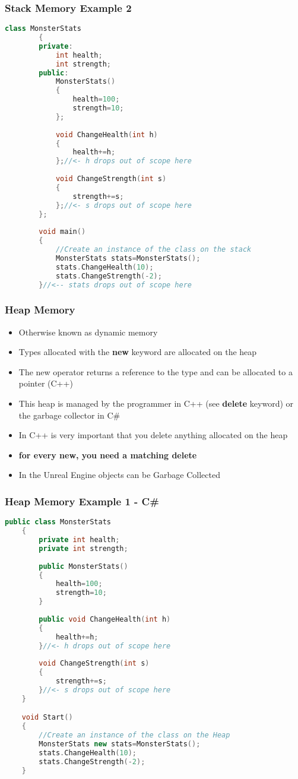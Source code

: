 \begin{frame}[fragile]
\frametitle{Stack Memory Example 2}
	\begin{lstlisting}[language=C++,basicstyle=\tiny,]
		class MonsterStats
		{
		private:
			int health;
			int strength;
		public:
			MonsterStats()
			{
				health=100;
				strength=10;
			};
	
			void ChangeHealth(int h)
			{
				health+=h;
			};//<- h drops out of scope here
	
			void ChangeStrength(int s)
			{
				strength+=s;
			};//<- s drops out of scope here
		};
	
		void main()
		{		
			//Create an instance of the class on the stack
			MonsterStats stats=MonsterStats();
			stats.ChangeHealth(10);
			stats.ChangeStrength(-2);
		}//<-- stats drops out of scope here
	\end{lstlisting}
\end{frame}

\begin{frame}
\frametitle{Heap Memory}
	\begin{itemize}
	\pause \item Otherwise known as dynamic memory
	\pause \item Types allocated with the \textbf{new} keyword are allocated on the heap
	\pause \item The new operator returns a reference to the type and can be allocated to a pointer (C++)
	\pause \item This heap is managed by the programmer in C++ (see \textbf{delete} keyword) or the garbage collector in C\#
	\pause \]\item In C++ is very important that you delete anything allocated on the heap
	\pause \item \textbf{for every new, you need a matching delete}
	\pause \item In the Unreal Engine objects can be Garbage Collected
	\end{itemize}
\end{frame}

\begin{frame}[fragile]
\frametitle{Heap Memory Example 1 - C\#}
\begin{lstlisting}[language=C++,basicstyle=\tiny,]
	public class MonsterStats
	{
		private int health;
		private int strength;
		
		public MonsterStats()
		{
			health=100;
			strength=10;
		}
	
		public void ChangeHealth(int h)
		{
			health+=h;
		}//<- h drops out of scope here
	
		void ChangeStrength(int s)
		{
			strength+=s;
		}//<- s drops out of scope here
	}

	void Start()
	{		
		//Create an instance of the class on the Heap
		MonsterStats new stats=MonsterStats();
		stats.ChangeHealth(10);
		stats.ChangeStrength(-2);
	}	
\end{lstlisting}
\end{frame}

